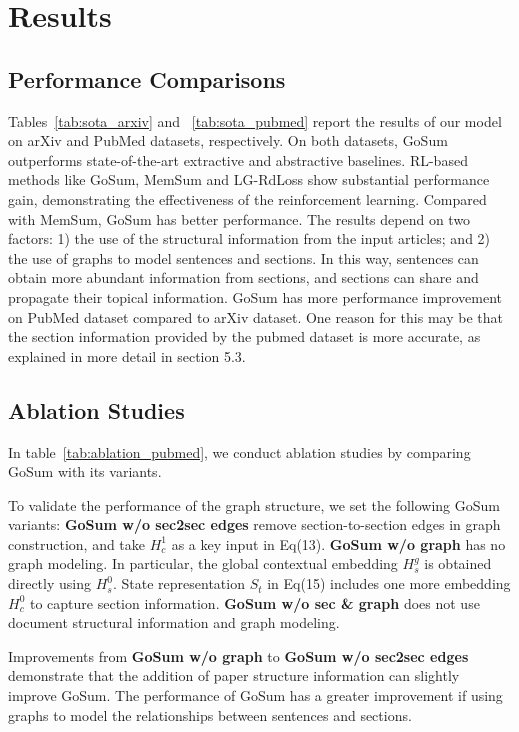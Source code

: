 \documentclass[11pt,a4paper]{article}
\begin{document}
 
\section{Results}

\subsection{Performance Comparisons}
Tables~\ref{tab:sota_arxiv} and ~\ref{tab:sota_pubmed} report the results of our model on arXiv and PubMed datasets, respectively.
On both datasets, GoSum outperforms state-of-the-art extractive and abstractive baselines. 
RL-based methods like GoSum, MemSum and LG-RdLoss show substantial performance gain, demonstrating the effectiveness of the reinforcement learning.
Compared with MemSum, GoSum has better performance. The results depend on two factors: 1) the use of the structural information from the input articles; and 2) the use of graphs to model sentences and sections. In this way, sentences can obtain more abundant information from sections, and sections can share and propagate their topical information.
GoSum has more performance improvement on PubMed dataset compared to arXiv dataset. One reason for this may be that the section information provided by the pubmed dataset is more accurate, as explained in more detail in section 5.3.



\subsection{Ablation Studies}

In table~\ref{tab:ablation_pubmed}, we conduct ablation studies by comparing GoSum with its variants.


To validate the performance of the graph structure, we set the following GoSum variants:
\textbf{GoSum w/o sec2sec edges} remove section-to-section edges in graph construction, and take $H_c^1$ as a key input in Eq(13).
\textbf{GoSum w/o graph} has no graph modeling. In particular, the global contextual embedding $H_s^g$ is obtained directly using $H_s^0$. State representation $S_t$ in Eq(15) includes one more embedding $H_c^0$ to capture section information.
\textbf{GoSum w/o sec \& graph} does not use document structural information and graph modeling.

Improvements from \textbf{GoSum w/o graph} to \textbf{GoSum w/o sec2sec edges} demonstrate that the addition of paper structure information can slightly improve GoSum. The performance of GoSum has a greater improvement if using graphs to model the relationships between sentences and sections.
\end{document}
